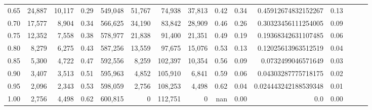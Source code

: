 \begin{tabular}{rrrrrrrrrrrrrrr}
0.65 &  24,887 &  10,117 &  0.29 &  549,048 &   51,767 &   74,938 &   37,813 &  0.42 &  0.34 &   0.45912674832152267 &      0.13 \\
0.70 &  17,577 &   8,904 &  0.34 &  566,625 &   34,190 &   83,842 &   28,909 &  0.46 &  0.26 &   0.30323456111254005 &      0.09 \\
0.75 &  12,352 &   7,558 &  0.38 &  578,977 &   21,838 &   91,400 &   21,351 &  0.49 &  0.19 &   0.19368342631107485 &      0.06 \\
0.80 &   8,279 &   6,275 &  0.43 &  587,256 &   13,559 &   97,675 &   15,076 &  0.53 &  0.13 &   0.12025613963512519 &      0.04 \\
0.85 &   5,300 &   4,722 &  0.47 &  592,556 &    8,259 &  102,397 &   10,354 &  0.56 &  0.09 &    0.0732499046571649 &      0.03 \\
0.90 &   3,407 &   3,513 &  0.51 &  595,963 &    4,852 &  105,910 &    6,841 &  0.59 &  0.06 &   0.04303287775718175 &      0.02 \\
0.95 &   2,096 &   2,343 &  0.53 &  598,059 &    2,756 &  108,253 &    4,498 &  0.62 &  0.04 &  0.024443242188539348 &      0.01 \\
1.00 &   2,756 &   4,498 &  0.62 &  600,815 &        0 &  112,751 &        0 &   nan &  0.00 &                   0.0 &      0.00 \\
\bottomrule
\end{tabular}
